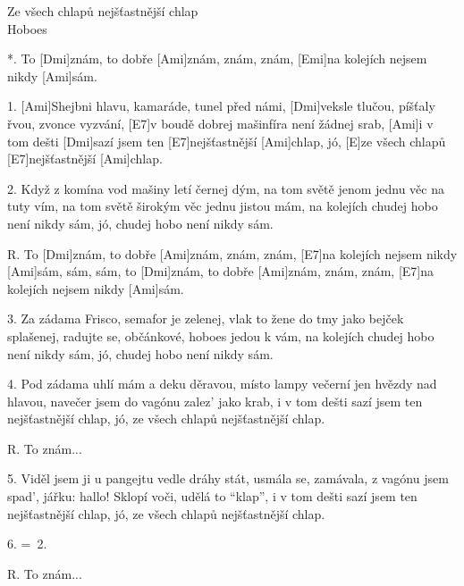 \begin{song}{Ze všech chlapů nejšťastnější chlap\\}{Hoboes}

\begin{xverse}{*. }
To [Dmi]znám, to dobře [Ami]znám, znám, znám,
[Emi]na kolejích nejsem nikdy [Ami]sám.
\end{xverse}

\begin{xverse}{1. }
[Ami]Shejbni hlavu, kamaráde, tunel před námi,
[Dmi]veksle tlučou, píšťaly řvou, zvonce vyzvání,
[E7]v boudě dobrej mašinfíra není žádnej srab,
[Ami]i v tom dešti [Dmi]sazí jsem ten [E7]nejšťastnější [Ami]chlap,
jó, [E]ze všech chlapů [E7]nejšťastnější [Ami]chlap.
\end{xverse}

\begin{xverse}{2. }
Když z komína vod mašiny letí černej dým,
na tom světě jenom jednu věc na tuty vím,
na tom světě širokým věc jednu jistou mám,
na kolejích chudej hobo není nikdy sám,
jó, chudej hobo není nikdy sám.
\end{xverse}

\begin{xverse}{R. }
To [Dmi]znám, to dobře [Ami]znám, znám, znám,
[E7]na kolejích nejsem nikdy [Ami]sám, sám, sám,
to [Dmi]znám, to dobře [Ami]znám, znám, znám,
[E7]na kolejích nejsem nikdy [Ami]sám.
\end{xverse}

\begin{xverse}{3. }
Za zádama Frisco, semafor je zelenej,
vlak to žene do tmy jako bejček splašenej,
radujte se, občánkové, hoboes jedou k vám,
na kolejích chudej hobo není nikdy sám,
jó, chudej hobo není nikdy sám.
\end{xverse}

\begin{xverse}{4. }
Pod zádama uhlí mám a deku děravou,
místo lampy večerní jen hvězdy nad hlavou,
navečer jsem do vagónu zalez' jako krab,
i v tom dešti sazí jsem ten nejšťastnější chlap,
jó, ze všech chlapů nejšťastnější chlap.
\end{xverse}

\begin{xverse}{R. }
To znám...
\end{xverse}

\begin{xverse}{5. }
Viděl jsem ji u pangejtu vedle dráhy stát,
usmála se, zamávala, z vagónu jsem spad',
jářku: hallo! Sklopí voči, udělá to ``klap'',
i v tom dešti sazí jsem ten nejšťastnější chlap,
jó, ze všech chlapů nejšťastnější chlap.
\end{xverse}

\begin{xverse}{6. }
=\ 2.
\end{xverse}

\begin{xverse}{R. }
To znám...
\end{xverse}

\end{song}